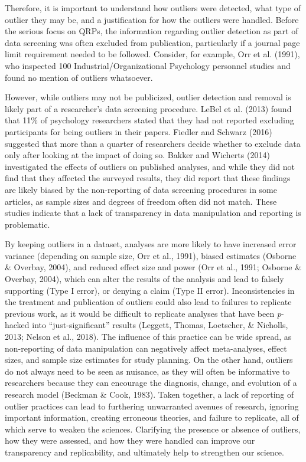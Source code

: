 \documentclass[english,,man]{apa6}
\theoremstyle{definition}
\theoremstyle{definition}
\theoremstyle{definition}
\theoremstyle{remark}
\begin{document}
Therefore, it is important to understand how outliers were detected,
what type of outlier they may be, and a justification for how the
outliers were handled. Before the serious focus on QRPs, the information
regarding outlier detection as part of data screening was often excluded
from publication, particularly if a journal page limit requirement
needed to be followed. Consider, for example, Orr et al. (1991), who
inspected 100 Industrial/Organizational Psychology personnel studies and
found no mention of outliers whatsoever.

However, while outliers may not be publicized, outlier detection and
removal is likely part of a researcher's data screening procedure. LeBel
et al. (2013) found that 11\% of psychology researchers stated that they
had not reported excluding participants for being outliers in their
papers. Fiedler and Schwarz (2016) suggested that more than a quarter of
researchers decide whether to exclude data only after looking at the
impact of doing so. Bakker and Wicherts (2014) investigated the effects
of outliers on published analyses, and while they did not find that they
affected the surveyed results, they did report that these findings are
likely biased by the non-reporting of data screening procedures in some
articles, as sample sizes and degrees of freedom often did not match.
These studies indicate that a lack of transparency in data manipulation
and reporting is problematic.

By keeping outliers in a dataset, analyses are more likely to have
increased error variance (depending on sample size, Orr et al., 1991),
biased estimates (Osborne \& Overbay, 2004), and reduced effect size and
power (Orr et al., 1991; Osborne \& Overbay, 2004), which can alter the
results of the analysis and lead to falsely supporting (Type I error),
or denying a claim (Type II error). Inconsistencies in the treatment and
publication of outliers could also lead to failures to replicate
previous work, as it would be difficult to replicate analyses that have
been \emph{p}-hacked into \enquote{just-significant} results (Leggett,
Thomas, Loetscher, \& Nicholls, 2013; Nelson et al., 2018). The
influence of this practice can be wide spread, as non-reporting of data
manipulation can negatively affect meta-analyses, effect sizes, and
sample size estimates for study planning. On the other hand, outliers do
not always need to be seen as nuisance, as they will often be
informative to researchers because they can encourage the diagnosis,
change, and evolution of a research model (Beckman \& Cook, 1983). Taken
together, a lack of reporting of outlier practices can lead to
furthering unwarranted avenues of research, ignoring important
information, creating erroneous theories, and failure to replicate, all
of which serve to weaken the sciences. Clarifying the presence or
absence of outliers, how they were assessed, and how they were handled
can improve our transparency and replicability, and ultimately help to
strengthen our science.
\end{document}
